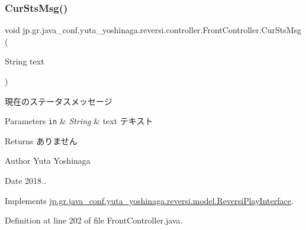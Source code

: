 \subsubsection{\texorpdfstring{Cur\+Sts\+Msg()}{CurStsMsg()}}
{\footnotesize\ttfamily void jp.\+gr.\+java\+\_\+conf.\+yuta\+\_\+yoshinaga.\+reversi.\+controller.\+Front\+Controller.\+Cur\+Sts\+Msg (\begin{DoxyParamCaption}\item[{String}]{text }\end{DoxyParamCaption})}



現在のステータスメッセージ 


\begin{DoxyParams}[1]{Parameters}
\mbox{\tt in}  & {\em String} & text テキスト \\
\hline
\end{DoxyParams}
\begin{DoxyReturn}{Returns}
ありません 
\end{DoxyReturn}
\begin{DoxyAuthor}{Author}
Yuta Yoshinaga 
\end{DoxyAuthor}
\begin{DoxyDate}{Date}
2018.. 
\end{DoxyDate}


Implements \hyperlink{interfacejp_1_1gr_1_1java__conf_1_1yuta__yoshinaga_1_1reversi_1_1model_1_1_reversi_play_interface_ad812b3735df400b42916b15e5c3ff9db}{jp.\+gr.\+java\+\_\+conf.\+yuta\+\_\+yoshinaga.\+reversi.\+model.\+Reversi\+Play\+Interface}.



Definition at line 202 of file Front\+Controller.\+java.

